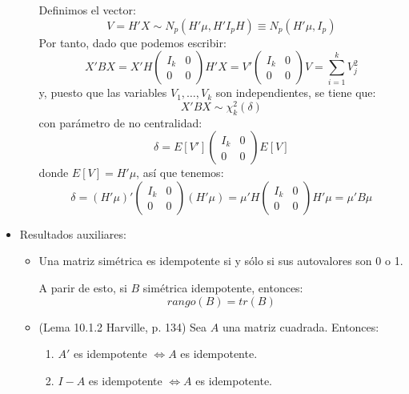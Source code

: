 \documentclass[11pt,a4paper]{article}
\begin{document}
\begin{itemize}
\begin{itemize}
Definimos el vector:
$$V = H'X \sim N_{p}(H'\mu, H'I_{p}H) \equiv N_{p}(H'\mu, I_{p})$$
Por tanto, dado que podemos escribir:
$$X'BX = X'H\begin{pmatrix}
I_{k} & 0 \\
0 & 0
\end{pmatrix}H'X = V'\begin{pmatrix}
I_{k} & 0 \\
0 & 0
\end{pmatrix} V = \sum_{i=1}^{k} V_{j}^{2}$$
y, puesto que las variables $V_{1}, \dots, V_{k}$ son independientes, se tiene que:
$$X'BX \sim \chi_{k}^{2}(\delta)$$
con parámetro de no centralidad:
$$\delta = E[V'] \begin{pmatrix}
I_{k} & 0 \\
0 & 0
\end{pmatrix} E[V]$$
donde $E[V] = H'\mu$, así que tenemos:
$$\delta = (H'\mu)' \begin{pmatrix}
I_{k} & 0 \\
0 & 0
\end{pmatrix} (H'\mu) = \mu'H \begin{pmatrix}
I_{k} & 0 \\
0 & 0
\end{pmatrix} H'\mu = \mu' B \mu$$
\end{itemize}

\item Resultados auxiliares:
\begin{itemize}
\item Una matriz simétrica es idempotente si y sólo si sus autovalores son 0 o 1.

A parir de esto, si $B$ simétrica idempotente, entonces:
$$rango(B) = tr(B)$$
\item (Lema 10.1.2 Harville, p. 134) Sea $A$ una matriz cuadrada. Entonces:
\begin{enumerate}
\item $A'$ es idempotente $\iff A$ es idempotente.
\item $I - A$ es idempotente $\iff A$ es idempotente.
\end{enumerate}
\end{itemize}


\end{itemize}
\end{document}
